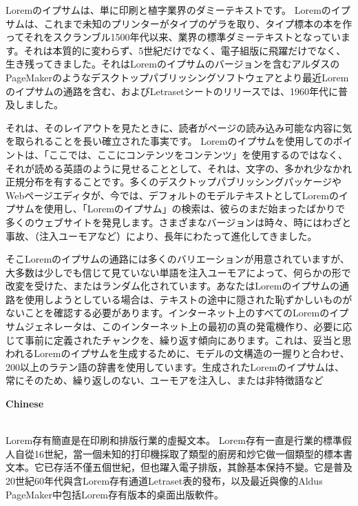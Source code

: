\documentclass[UTF8,nofonts]{ctexart}
\begin{document}
\par
Loremのイプサムは、単に印刷と植字業界のダミーテキストです。 Loremのイプサムは、これまで未知のプリンターがタイプのゲラを取り、タイプ標本の本を作ってそれをスクランブル1500年代以来、業界の標準ダミーテキストとなっています。それは本質的に変わらず、5世紀だけでなく、電子組版に飛躍だけでなく、生き残ってきました。それはLoremのイプサムのバージョンを含むアルダスのPageMakerのようなデスクトップパブリッシングソフトウェアとより最近Loremのイプサムの通路を含む、およびLetrasetシートのリリースでは、1960年代に普及しました。

それは、そのレイアウトを見たときに、読者がページの読み込み可能な内容に気を取られることを長い確立された事実です。 Loremのイプサムを使用してのポイントは、「ここでは、ここにコンテンツをコンテンツ」を使用するのではなく、それが読める英語のように見せることとして、それは、文字の、多かれ少なかれ正規分布を有することです。多くのデスクトップパブリッシングパッケージやWebページエディタが、今では、デフォルトのモデルテキストとしてLoremのイプサムを使用し、「Loremのイプサム」の検索は、彼らのまだ始まったばかりで多くのウェブサイトを発見します。さまざまなバージョンは時々、時にはわざと事故、（注入ユーモアなど）により、長年にわたって進化してきました。

そこLoremのイプサムの通路には多くのバリエーションが用意されていますが、大多数は少しでも信じて見ていない単語を注入ユーモアによって、何らかの形で改変を受けた、またはランダム化されています。あなたはLoremのイプサムの通路を使用しようとしている場合は、テキストの途中に隠された恥ずかしいものがないことを確認する必要があります。インターネット上のすべてのLoremのイプサムジェネレータは、このインターネット上の最初の真の発電機作り、必要に応じて事前に定義されたチャンクを、繰り返す傾向にあります。これは、妥当と思われるLoremのイプサムを生成するために、モデルの文構造の一握りと合わせ、200以上のラテン語の辞書を使用しています。生成されたLoremのイプサムは、常にそのため、繰り返しのない、ユーモアを注入し、または非特徴語など\\

\par
\textbf{\huge{}Chinese}\\\\

\par
Lorem存有簡直是在印刷和排版行業的虛擬文本。 Lorem存有一直是行業的標準假人自從16世紀，當一個未知的打印機採取了類型的廚房和炒它做一個類型的標本書文本。它已存活不僅五個世紀，但也躍入電子排版，其餘基本保持不變。它是普及20世紀60年代與含Lorem存有通道Letraset表的發布，以及最近與像的Aldus PageMaker中包括Lorem存有版本的桌面出版軟件。
\end{document}
